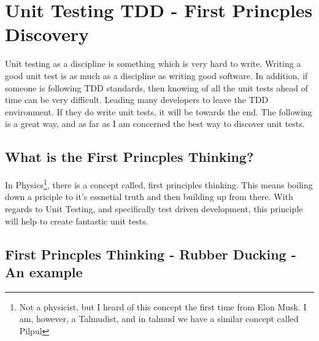 \maketitle{}
\section{ Unit Testing TDD - First Princples Discovery }

Unit testing as a discipline is something which is very hard to write. Writing
a good unit test is as much as a discipline as writing good software. In
addition, if someone is following TDD standards, then knowing of all the unit
tests ahead of time can be very difficult. Leading many developers to leave the
TDD environment. If they do write unit tests, it will be towards the end. The
following is a great way, and as far as I am concerned the best way to discover
unit tests.

\subsection{ What is the First Princples Thinking? }
In Physics\footnote{Not a physicist, but I heard of this concept the first time
from Elon Musk. I am, however, a Talmudist, and in talmud we have a similar
concept called Pilpul}, there is a concept called, first principles thinking.
This means boiling down a priciple to it's essnetial truth and then building up
from there. With regards to Unit Testing, and specifically test driven
development, this principle will help to create fantastic unit tests.

\subsection{ First Princples Thinking - Rubber Ducking - An example }

